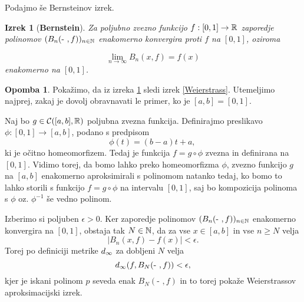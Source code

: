 \documentclass[a4paper, reqno]{amsart}
\theoremstyle{theorem}
\newtheorem{izrek}{Izrek}[section]
\theoremstyle{definition}
\newtheorem*{opomba*}{Opomba}
\begin{document}
Podajmo še Bernsteinov izrek.

\begin{izrek}[\textbf{Bernstein}]
	\label{Bernsteinov izrek}
	Za poljubno zvezno funkcijo $f:[0, 1] \to \mathbb{R}$ zaporedje polinomov 
	$(B_n(\text{- },f))_{n \in \mathbb{N}}$ enakomerno konvergira
	proti $f$ na $[0, 1]$, oziroma

	$$ \lim_{n\to\infty}B_n(x, f) = f(x)$$
\noindent
	enakomerno na $[0,1]$.
\end{izrek}

\begin{opomba*}
	Pokažimo, da iz izreka \ref{Bernsteinov izrek} sledi izrek \ref{Weierstrass}.
	Utemeljimo najprej, zakaj je dovolj obravnavati le primer, ko je $[a,b] = [0,1]$.
	
	Naj bo $g \in \mathcal{C}([a,b],\mathbb{R})$ poljubna zvezna funkcija. 
	Definirajmo preslikavo \linebreak $\phi: [0,1] \to [a,b]$, podano s predpisom
	$$ \phi(t) = (b - a)t + a \text{, }$$
	ki je očitno homeomorfizem. Tedaj je funkcija $f = g \circ \phi$ zvezna in definirana
	na $[0,1]$. Vidimo torej, da bomo lahko preko homeomorfizma $\phi$, zvezno funkcijo $g$
	na $[a,b]$ enakomerno aproksimirali s polinomom natanko tedaj, ko bomo to lahko
	storili s funkcijo $f = g \circ \phi$ na intervalu $[0,1]$, saj bo kompozicija polinoma
	s $\phi$ oz. $\phi^{-1}$ še vedno polinom.

	Izberimo si poljuben $\epsilon > 0$. Ker zaporedje polinomov 
	$(B_n(\text{- },f))_{n \in \mathbb{N}}$ enakomerno konvergira na $[0,1]$, obstaja tak 
	$N \in \mathbb{N}$, da za vse $x \in [a,b]$ in vse $n \geq N$ velja
	$$ |B_n(x,f) - f(x)| < \epsilon\text{.}$$
	Torej po definiciji metrike $d_{\infty}$ za dobljeni $N$ velja
	\begin{equation*}
		d_{\infty}(f, B_N(\text{- },f)) < \epsilon \text{,}
	\end{equation*}
	kjer je iskani polinom $p$ seveda enak $B_N(\text{- },f)$ in to torej pokaže 
	Weierstrassov aproksimacijski izrek.
\end{opomba*}
\end{document}
